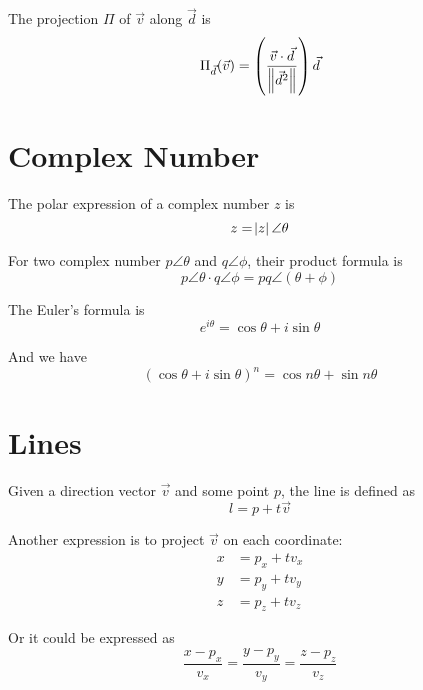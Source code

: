 The projection $\Pi$ of $\vec{v}$ along $\vec{d}$ is
\begin{equation}
    \Pi_{\vec{d}} (\vec{v}) = \left(\frac{\vec{v} \cdot \vec{d}}{\left\Vert {\vec{d}^2} \right\Vert}\right) \vec{d}
\end{equation}

\section{Complex Number}

The polar expression of a complex number $z$ is
\begin{equation}
    z = \abs{z} \angle \theta
\end{equation}

For two complex number $p \angle \theta$ and $q \angle \phi$, their product formula is
\begin{equation}
    p \angle \theta \cdot q \angle \phi = pq \angle (\theta + \phi)
\end{equation}

\begin{theorem} The Euler's formula is
\begin{equation}
    e^{i \theta} = \cos \theta + i \sin \theta
\end{equation}

And we have
\begin{equation}
    (\cos \theta + i \sin \theta)^n = \cos n \theta + \sin n \theta
\end{equation}
\end{theorem}


\section{Lines}

\begin{definition}
    Given a direction vector $\vec{v}$ and some point $p$, the line is defined as 
    \begin{equation}
        l = p + t \vec{v}
    \end{equation}
\end{definition}

\begin{definition}
    Another expression is to project $\vec{v}$ on each coordinate:
\begin{equation}
    \begin{aligned}
        x &= p_x + t v_x \\
        y &= p_y + t v_y \\
        z &= p_z + t v_z
    \end{aligned} 
\end{equation}

Or it could be expressed as
\begin{equation}
    \frac{x - p_x}{v_x} = \frac{y - p_y}{v_y}  = \frac{z - p_z}{v_z}
\end{equation}
\end{definition}

